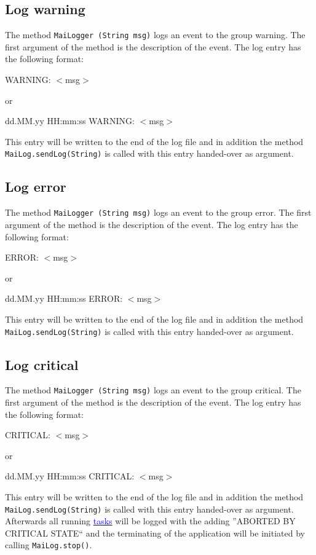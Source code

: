 \documentclass{article}
\newcommand{\refh}[2]{\hyperref[#1] {\textcolor{blue}{#2}}}
\begin{document}
    \subsection{Log warning}
    \label{logging_warning}
    The method \lstinline|MaiLogger (String msg)| logs an event to the group warning.
    The first argument of the method is the description of the event.
    The log entry has the following format:
    \begin{description}
        \item WARNING: $<$msg$>$
        \item or
        \item dd.MM.yy HH:mm:ss WARNING: $<$msg$>$
    \end{description}
    This entry will be written to the end of the log file and in addition the method \lstinline|MaiLog.sendLog(String)| is called with this entry handed-over as argument.

    \subsection{Log error}
    \label{logging_error}
    The method \lstinline|MaiLogger (String msg)| logs an event to the group error.
    The first argument of the method is the description of the event.
    The log entry has the following format:
    \begin{description}
        \item ERROR: $<$msg$>$
        \item or
        \item dd.MM.yy HH:mm:ss ERROR: $<$msg$>$
    \end{description}
    This entry will be written to the end of the log file and in addition the method \lstinline|MaiLog.sendLog(String)| is called with this entry handed-over as argument.

    \subsection{Log critical}
    \label{logging_critical}
    The method \lstinline|MaiLogger (String msg)| logs an event to the group critical.
    The first argument of the method is the description of the event.
    The log entry has the following format:
    \begin{description}
        \item CRITICAL: $<$msg$>$
        \item or
        \item dd.MM.yy HH:mm:ss CRITICAL: $<$msg$>$
    \end{description}
    This entry will be written to the end of the log file and in addition the method \lstinline|MaiLog.sendLog(String)| is called with this entry handed-over as argument.
    Afterwards all running \refh{tasks}{tasks} will be logged with the adding ''ABORTED BY CRITICAL STATE`` and the terminating of the application will be initiated by calling \lstinline|MaiLog.stop()|.
\end{document}
